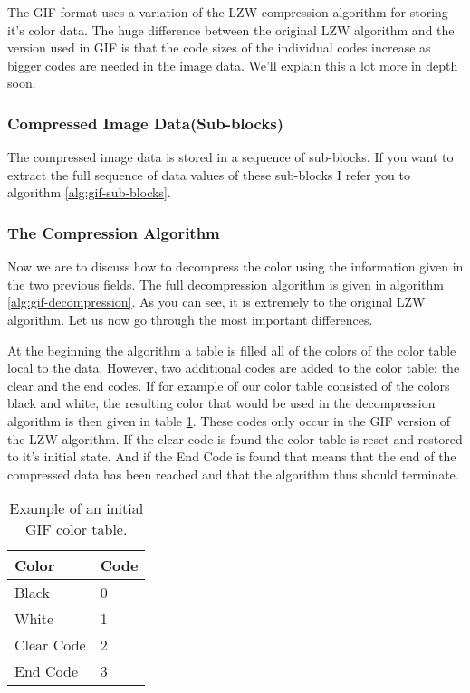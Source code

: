 \begin{refsection}
  The GIF format uses a variation of the LZW compression algorithm
  for storing it's color data. The huge difference between the
  original LZW algorithm and the version used in GIF is that the
  code sizes of the individual codes increase as bigger codes are
  needed in the image data. We'll explain this a lot more in depth
  soon.

  \subsubsection{Compressed Image Data(Sub-blocks)}

  The compressed image data is stored in a sequence of sub-blocks. If
  you want to extract the full sequence of data values of these
  sub-blocks I refer you to algorithm \ref{alg:gif-sub-blocks}.

  \subsubsection{The Compression Algorithm}

  Now we are to discuss how to decompress the color using the
  information given in the two previous fields. The full decompression
  algorithm is given in algorithm \ref{alg:gif-decompression}. As you
  can see, it is extremely to the original LZW algorithm. Let us now
  go through the most important differences.

  At the beginning the algorithm a table is filled all of the colors
  of the color table local to the data. However, two additional codes
  are added to the color table: the clear and the end codes. If for
  example of our color table consisted of the colors black and white,
  the resulting color that would be used in the decompression
  algorithm is then given in table
  \ref{tab:example-gif-color-table}. These codes only occur in the GIF
  version of the LZW algorithm. If the clear code is found the color
  table is reset and restored to it's initial state. And if the End
  Code is found that means that the end of the compressed data has
  been reached and that the algorithm thus should terminate.

\begin{table}
    \centering
    \begin{tabular}{ll}
      \toprule
      Color & Code \\
      \midrule
      Black & 0 \\
      White & 1 \\
      Clear Code & 2 \\
      End Code & 3 \\
      \bottomrule
    \end{tabular}
    \caption{Example of an initial GIF color table.}
    \label{tab:example-gif-color-table}
  \end{table}


\end{refsection}
